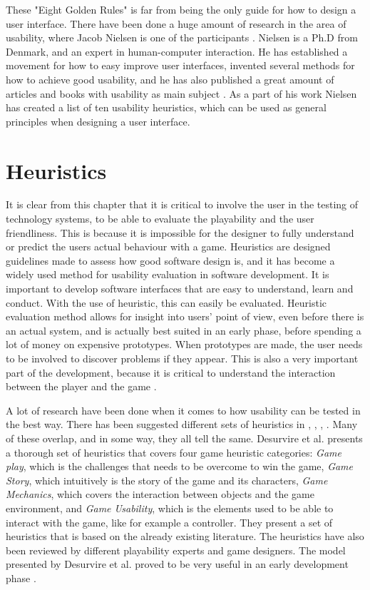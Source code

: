 These "Eight Golden Rules" is far from being the only guide for how to design a user interface. There have been done a huge amount of research in the area of usability, where Jacob Nielsen is one of the participants \cite{nielsen2005ten}. Nielsen is a Ph.D from Denmark, and an expert in human-computer interaction. He has established a movement for how to easy improve user interfaces, invented several methods for how to achieve good usability, and he has also published a great amount of articles and books with usability as main subject \cite{JNielsen}. As a part of his work Nielsen has created a list of ten usability heuristics, which can be used as general principles when designing a user interface\cite{nielsen2005ten}. 

\section{Heuristics}
It is clear from this chapter that it is critical to involve the user in the testing of technology systems, to be able to evaluate the playability and the user friendliness. This is because it is impossible for the designer to fully understand or predict the users actual behaviour with a game.  Heuristics are designed guidelines made to assess how good software design is, and it has become a widely used method for usability evaluation in software development. It is important to develop software interfaces that are easy to understand, learn and conduct. With the use of heuristic, this can easily be evaluated. Heuristic evaluation method allows for insight into users' point of view, even before there is an actual system, and is actually best suited in an early phase, before spending a lot of money on expensive prototypes. When prototypes are made, the user needs to be involved to discover problems if they appear. This is also a very important part of the development, because it is critical to understand the interaction between the player and the game \cite{desurvire}. 

A lot of research have been done when it comes to how usability can be tested in the best way. There has been suggested different sets of heuristics in \cite{nielsen2005ten}, \cite{malone}, \cite{shelley}, \cite{federoff}. Many of these overlap, and in some way, they all tell the same.  Desurvire et al. presents a thorough set of heuristics that covers four game heuristic categories:  \emph{Game play}, which is the challenges that needs to be overcome to win the game, \emph{Game Story}, which intuitively is the story of the game and its characters, \emph{Game Mechanics}, which covers the interaction between objects and the game environment, and  \emph{Game Usability}, which is the elements used to be able to interact with the game, like for example a controller. They present a set of heuristics that is based on the already existing literature. The heuristics have also been reviewed by different playability experts and game designers. The model presented by Desurvire et al. proved to be very useful in an early development phase \cite{desurvire}.

